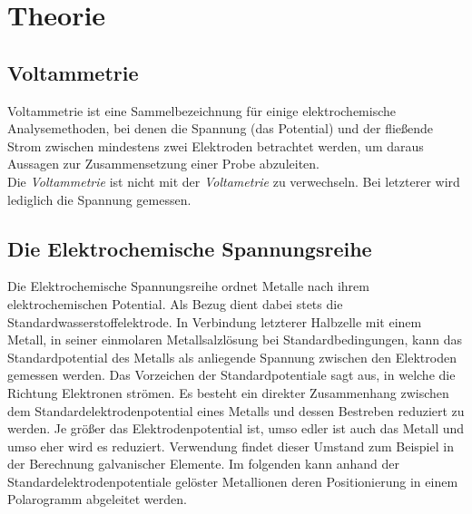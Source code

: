 \section{Theorie}
\label{sec:theorie}

\subsection{Voltammetrie}
Voltammetrie ist eine Sammelbezeichnung für einige elektrochemische Analysemethoden, bei denen die Spannung (das Potential) und der fließende Strom zwischen mindestens zwei Elektroden betrachtet werden, um daraus Aussagen zur Zusammensetzung einer Probe abzuleiten.\\
Die \textit{Voltammetrie} ist nicht mit der \textit{Voltametrie} zu verwechseln. Bei letzterer wird lediglich die Spannung gemessen.
\subsection{Die Elektrochemische Spannungsreihe}


Die Elektrochemische Spannungsreihe ordnet Metalle nach ihrem elektrochemischen Potential. Als Bezug dient dabei stets die Standardwasserstoffelektrode. In Verbindung letzterer Halbzelle mit einem Metall, in seiner einmolaren Metallsalzlösung bei Standardbedingungen, kann das Standardpotential des Metalls als anliegende Spannung zwischen den Elektroden gemessen werden. Das Vorzeichen der Standardpotentiale sagt aus, in welche die Richtung Elektronen strömen. Es besteht ein direkter Zusammenhang zwischen dem Standardelektrodenpotential eines Metalls und dessen Bestreben reduziert zu werden. Je größer das Elektrodenpotential ist, umso edler ist auch das Metall und umso eher wird es reduziert. Verwendung findet dieser Umstand zum Beispiel in der Berechnung galvanischer Elemente. Im folgenden kann anhand der Standardelektrodenpotentiale gelöster Metallionen deren Positionierung in einem Polarogramm abgeleitet werden.\cite{spannungsreihe}\\

\vline

